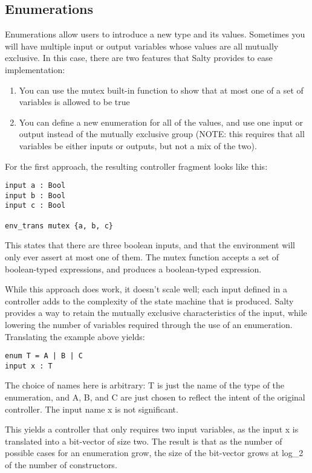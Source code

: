 \subsection{Enumerations}

Enumerations allow users to introduce a new type and its values. Sometimes you will 
have multiple input or output variables whose values are all mutually exclusive. 
In this case, there are two features that Salty provides to ease implementation:

\begin{enumerate}
\item You can use the mutex built-in function to show that at most one of a set of 
variables is allowed to be true
\item You can define a new enumeration for all of the values, and use one input or 
output instead of the mutually exclusive group (NOTE: this requires that all variables 
be either inputs or outputs, but not a mix of the two).
\end{enumerate}

\noindent For the first approach, the resulting controller fragment looks like this:

\begin{lstlisting}
input a : Bool
input b : Bool
input c : Bool

env_trans mutex {a, b, c}
\end{lstlisting}
This states that there are three boolean inputs, and that the environment will only 
ever assert at most one of them. The mutex function accepts a set of boolean-typed 
expressions, and produces a boolean-typed expression.

While this approach does work, it doesn't scale well; each input defined in a 
controller adds to the complexity of the state machine that is produced. Salty 
provides a way to retain the mutually exclusive characteristics of the input, while 
lowering the number of variables required through the use of an enumeration. 
Translating the example above yields:
\begin{lstlisting}
enum T = A | B | C
input x : T
\end{lstlisting}
The choice of names here is arbitrary: T is just the name of the type of the 
enumeration, and A, B, and C are just chosen to reflect the intent of the original 
controller. The input name x is not significant.

This yields a controller that only requires two input variables, 
as the input x is translated into a bit-vector of size two. The 
result is that as the number of possible cases for an enumeration grow, 
the size of the bit-vector grows at log\_2 of the number of constructors.

